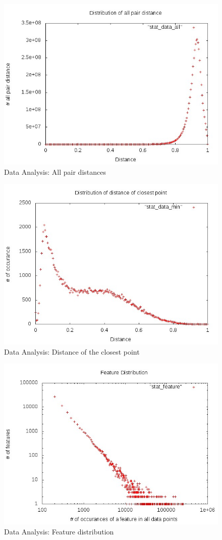 \begin{figure}[ht!]	
\centering
\includegraphics[width=0.7 \columnwidth]{img/all.jpg}
\caption{Data Analysis: All pair distances}
\end{figure}
\begin{figure}[ht!]	
\centering
\includegraphics[width=0.7 \columnwidth]{img/min.jpg}
\caption{Data Analysis: Distance of the closest point}
\end{figure}

\begin{figure}[ht!]	
\centering
\includegraphics[width=0.7 \columnwidth]{img/feature.jpg}
\caption{Data Analysis: Feature distribution}
\end{figure}


